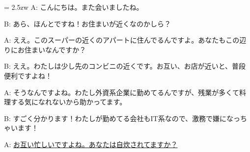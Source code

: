 \documentclass[11pt]{amsart}
\title{}
\author{}
\newenvironment{hangall}[1]{\hangindent = 2.5zw\everypar{\hangindent = 2.5zw}}{}
\begin{document}
\maketitle
\begin{hangall}{}%
A: こんにちは。また会いましたね。

B: あら、ほんとですね！お住まいが近くなのかしら？

A: ええ。このスーパーの近くのアパートに住んでるんですよ。あなたもこの辺りにお住まいなんですか？

B: ええ。わたしは少し先のコンビニの近くです。お互い、お店が近いと、普段便利ですよね！

A: そうなんですよね。わたし外資系企業に勤めてるんですが、残業が多くて料理する気になれないから助かってます。

B: すごく分かります！わたしが勤めてる会社もIT系なので、激務で嫌になっちゃいます！

A: \ul{お互い忙しいですよね。あなたは自炊されてますか？}\end{hangall}
\end{document}

